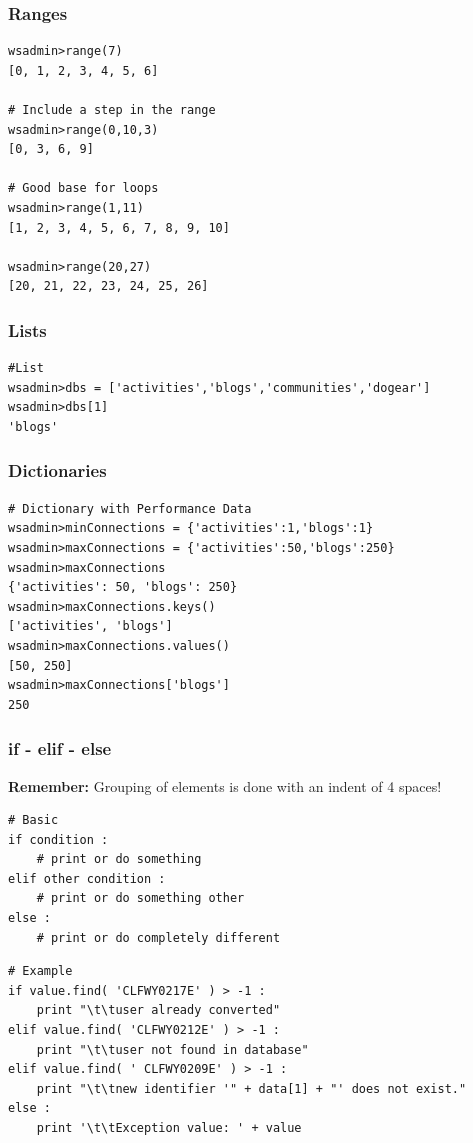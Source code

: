 \documentclass[12pt,a4paper]{article}
\begin{document}
\subsubsection{Ranges}

\begin{lstlisting}[style=Python]
wsadmin>range(7)
[0, 1, 2, 3, 4, 5, 6]
 
# Include a step in the range
wsadmin>range(0,10,3)
[0, 3, 6, 9]
 
# Good base for loops
wsadmin>range(1,11)
[1, 2, 3, 4, 5, 6, 7, 8, 9, 10]
 
wsadmin>range(20,27)
[20, 21, 22, 23, 24, 25, 26]
\end{lstlisting}

\subsubsection{Lists}

\begin{lstlisting}[style=Python]
#List
wsadmin>dbs = ['activities','blogs','communities','dogear']
wsadmin>dbs[1]
'blogs'
\end{lstlisting}

\subsubsection{Dictionaries}
\begin{lstlisting}[style=Python]
# Dictionary with Performance Data
wsadmin>minConnections = {'activities':1,'blogs':1}
wsadmin>maxConnections = {'activities':50,'blogs':250}
wsadmin>maxConnections
{'activities': 50, 'blogs': 250}
wsadmin>maxConnections.keys()
['activities', 'blogs']
wsadmin>maxConnections.values()
[50, 250]
wsadmin>maxConnections['blogs']
250
\end{lstlisting}

\subsubsection{if - elif - else}

\textbf{Remember:} Grouping of elements is done with an indent of 4 spaces!

\begin{lstlisting}[style=Python]
# Basic
if condition :
    # print or do something
elif other condition :
    # print or do something other
else :
    # print or do completely different
\end{lstlisting}

\begin{lstlisting}[style=Python]
# Example
if value.find( 'CLFWY0217E' ) > -1 :
    print "\t\tuser already converted"
elif value.find( 'CLFWY0212E' ) > -1 :
    print "\t\tuser not found in database"
elif value.find( ' CLFWY0209E' ) > -1 :
    print "\t\tnew identifier '" + data[1] + "' does not exist."
else :
    print '\t\tException value: ' + value
\end{lstlisting}
\end{document}
